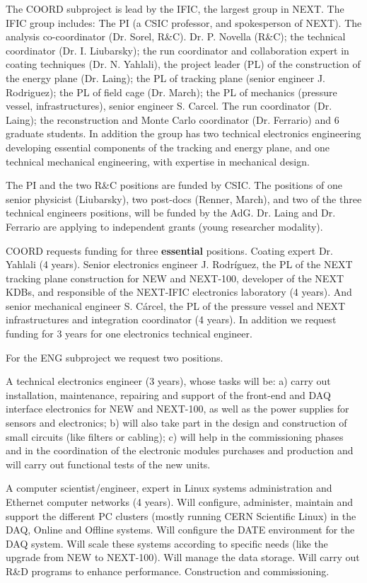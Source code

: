 The COORD subproject is lead by the IFIC, the largest group in NEXT. The IFIC group includes: The PI (a CSIC professor, and spokesperson of NEXT). The analysis co-coordinator (Dr. Sorel, R\&C). Dr. P. Novella (R\&C); the technical coordinator (Dr. I. Liubarsky); the run coordinator and collaboration expert in coating techniques (Dr. N. Yahlali), the project leader (PL) of the construction of the energy plane (Dr. Laing); the PL of tracking plane (senior engineer J. Rodriguez); the PL of field cage (Dr. March); the PL of mechanics (pressure vessel, infrastructures), senior engineer S. Carcel. The run coordinator (Dr. Laing); the reconstruction and Monte Carlo coordinator (Dr. Ferrario) and 6 graduate students. In addition the group has two technical electronics engineering developing essential components of the tracking and energy plane, and one technical mechanical engineering, with expertise in mechanical design. 

The PI and the two R\&C positions are funded by CSIC. The positions of one senior physicist (Liubarsky), two post-docs (Renner, March), and two of the three technical engineers positions, will be funded by the AdG. Dr. Laing and Dr. Ferrario are applying to independent grants (young researcher modality). 

COORD requests funding for three {\bf essential} positions. Coating expert Dr. Yahlali (4 years). Senior electronics engineer J. Rodríguez, the PL of the NEXT tracking plane construction for NEW and NEXT-100, developer of the NEXT KDBs, and responsible of the NEXT-IFIC electronics laboratory (4 years). And senior mechanical engineer S. Cárcel, the PL of the pressure vessel and NEXT infrastructures and integration coordinator (4 years). In addition we request funding for 3 years for one electronics technical engineer.  

For the ENG subproject we request two positions.

A technical electronics engineer (3 years), whose tasks will be: a) carry out installation, maintenance, repairing and support of the front-end and DAQ interface electronics for NEW and NEXT-100, as well as the power supplies for sensors and electronics; b) will also take part in the design and construction of small circuits (like filters or cabling); c) will help in the commissioning phases and in the coordination of the electronic modules purchases and production and will carry out functional tests of the new units. 

A computer scientist/engineer, expert in Linux systems administration and Ethernet computer networks (4 years). Will configure, administer, maintain and support the different PC clusters (mostly running CERN Scientific Linux) in the DAQ, Online and Offline systems. Will configure the DATE environment for the DAQ system. Will scale these systems according to specific needs (like the upgrade from NEW to NEXT-100). Will manage the data storage. Will carry out R\&D programs to enhance performance. Construction and commissioning. 

